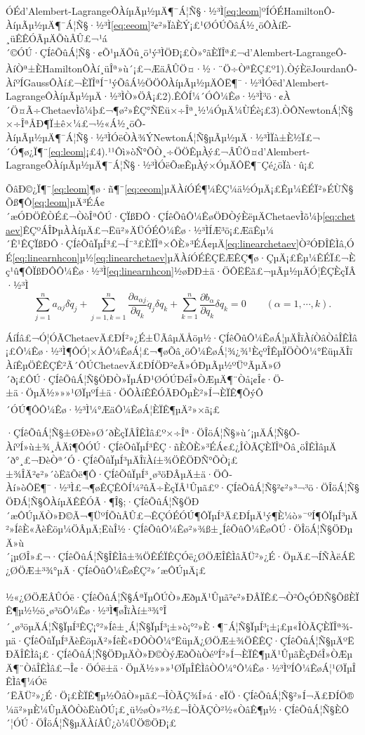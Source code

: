 \documentclass[A4,twoside]{ctexart}
\newcommand{\supercite}[1]{\textsuperscript{\cite{#1}}}
\begin{document}
ÓÉd'Alembert-LagrangeÔ­ÀíµÃµ½µÄ¶¯Á¦Ñ§·½³Ì\eqref{eq:leom}ºÍÓÉHamiltonÔ­ÀíµÃµ½µÄ¶¯Á¦Ñ§·½³Ì\eqref{eq:eeom}²¢²»ÏàÈÝ¡£¹ØÓÚÕâÁ½¸öÔ­ÀíË­¸üÊÊÓÃµÄÕùÂÛ£¬¹á´©ÓÚ·ÇÍêÕûÁ¦Ñ§·¢Õ¹µÄÕû¸ö¹ý³ÌÖÐ¡£Ò»°ãÈÏÎª£¬d'Alembert-LagrangeÔ­ÀíÒª±ÈHamiltonÔ­Àí¸üÎª»ù´¡\supercite{3,4}£¬ÆäÂÛÖ¤·½·¨Ö÷ÒªÊÇ£º1).ÒýÈëJourdanÔ­ÀíºÍGaussÔ­Àí£¬ÈÏÎªÍ¨¹ýÕâÁ½ÖÖÔ­ÀíµÃµ½µÄÔË¶¯·½³ÌÓëd'Alembert-LagrangeÔ­ÀíµÃµ½µÄ·½³ÌÒ»ÖÂ¡£2).ÊÔÍ¼´ÓÔ¼Êø·½³Ì³ö·¢À´Ö¤Ã÷ChetaevÌõ¼þ£¬¶ø²»ÊÇ°ÑËü×÷Îª¸½¼ÓµÄ¼ÙÉè¡£3).ÒÔNewtonÁ¦Ñ§×÷ÎªÅÐ¶Ï±ê×¼£¬½«Á½¸öÔ­ÀíµÃµ½µÄ¶¯Á¦Ñ§·½³ÌÓëÒÀ¾ÝNewtonÁ¦Ñ§µÃµ½µÄ·½³ÌÏà±È½Ï£¬´Ó¶ø¿Ï¶¨\eqref{eq:leom}¡£4).¹¹Ôì»òÑ°ÕÒ¸÷ÖÖÊµÀý£¬ÂÛÖ¤d'Alembert-LagrangeÔ­ÀíµÃµ½µÄ¶¯Á¦Ñ§·½³ÌÓëÕæÊµÀý×ÓµÄÔË¶¯Çé¿öÏà·û¡£


ÕâÐ©¿Ï¶¨\eqref{eq:leom}¶ø·ñ¶¨\eqref{eq:eeom}µÄÀíÓÉ¶¼ÊÇ¼ä½ÓµÄ¡£Êµ¼ÊÉÏ²»ÉÙÑ§Õß¶Ô\eqref{eq:leom}µÄ³ÉÁ¢´æÓÐÖÊÒÉ£¬ÒòÎªÔÚ·ÇÏßÐÔ·ÇÍêÕûÔ¼ÊøÖÐÒýÈëµÄChetaevÌõ¼þ\eqref{eq:chetaev}ÊÇºÁÎÞµÀÀíµÄ£¬Ëü²»ÄÜÓÉÔ¼Êø·½³ÌÍÆ³ö¡£ÆäÊµ¼´Ê¹ÊÇÏßÐÔ·ÇÍêÕûÏµÍ³£¬Í¨³£ÈÏÎª×ÔÈ»³ÉÁ¢µÄ\eqref{eq:linearchetaev}Ò²ÓÐÎÊÌâ,ÓÉ\eqref{eq:linearnhcon}µ½\eqref{eq:linearchetaev}µÄÀíÓÉÊÇËÆÊÇ¶ø·ÇµÄ¡£Êµ¼ÊÉÏ£¬Èç¹û¶ÔÏßÐÔÔ¼Êø·½³Ì\eqref{eq:linearnhcon}½øÐÐ±ä·ÖÔËËã£¬µÃµ½µÄÓ¦ÊÇÈçÏÂ·½³Ì
\begin{equation}
 \sum_{j = 1}^n a_{\alpha j}  \delta \dot{ q}_j +  \sum_{j = 1,k=1}^n \frac{\partial a_{\alpha j} }{\partial q_k} \dot{ q}_j \delta q_k +\sum_{k=1}^n \frac{\partial b_\alpha }{\partial q_k}\delta q_k = 0 \hspace{2em} ( \alpha = 1, \cdots, k).
\end{equation}

ÁíÍâ£¬Ó¦ÓÃChetaevÄ£ÐÍ²»¿É±ÜÃâµÄÅöµ½·ÇÍêÕûÔ¼ÊøÁ¦µÄÎïÀíÒâÒåÎÊÌâ¡£Ô¼Êø·½³Ì¶ÔÓ¦×ÅÔ¼ÊøÁ¦£¬¶øÕâ¸öÔ¼ÊøÁ¦¾¿¾¹ÈçºÎÊµÏÖÒÔ¼°ËüµÄÎïÀíÊµÖÊÊÇÊ²Ã´ÔÚChetaevÄ£ÐÍÖÐ²¢Ã»ÓÐµÃµ½ºÜºÃµÄ»Ø´ð¡£ÔÚ·ÇÍêÕûÁ¦Ñ§ÖÐÒ»ÏµÁÐ¹ØÓÚÐéÎ»ÒÆµÄ¶¨Òå¡¢Î¢·Ö-±ä·ÖµÄ½»»»¹ØÏµºÍ±ä·ÖÔ­ÀíÊÊÓÃÐÔµÈ²»Í¬ÈÏÊ¶ÕýÔ´ÓÚ¶ÔÔ¼Êø·½³Ì¼°ÆäÔ¼ÊøÁ¦ÈÏÊ¶µÄ²»×ã\supercite{8}¡£

·ÇÍêÕûÁ¦Ñ§±ØÐè»Ø´ðÈçÏÂÎÊÌâ£º×÷Îª·ÖÎöÁ¦Ñ§»ù´¡µÄÁ¦Ñ§Ô­ÀíºÍ»ù±¾¸ÅÄî¶ÔÓÚ·ÇÍêÕûÏµÍ³ÊÇ·ñÈÔÈ»³ÉÁ¢£¿ÎÒÃÇÈÏÎªÕâ¸öÎÊÌâµÄ´ð°¸£¬ÐèÒª´Ó·ÇÍêÕûÏµÍ³µÄÎïÀí±¾ÖÊÖÐÑ°ÕÒ¡£±¾ÎÄ²¢²»´òËãÕë¶Ô·ÇÍêÕûÏµÍ³¸ø³öÐÂµÄ±ä·ÖÔ­Àí»òÔË¶¯·½³Ì£¬¶øÊÇÊÔÍ¼²ûÃ÷ÈçÏÂ¹Ûµã£º·ÇÍêÕûÁ¦Ñ§²¢²»³¬³ö·ÖÎöÁ¦Ñ§ÖÐÁ¦Ñ§Ô­ÀíµÄÊÊÓÃ·¶Î§;·ÇÍêÕûÁ¦Ñ§ÖÐ´æÔÚµÄÒ»Ð©Ã¬¶ÜºÍÕùÂÛ£¬ÊÇÓÉÓÚ¶ÔÏµÍ³Ä£ÐÍµÄ¹ý¶È¼ò»¯ºÍ¶ÔÏµÍ³µÄ²»ÍêÈ«ÃèÊöµ¼ÖÂµÄ;ËùÎ½·ÇÍêÕûÔ¼Êø²»¾ß±¸ÍêÕûÔ¼ÊøÔÚ·ÖÎöÁ¦Ñ§ÖÐµÄ»ù´¡µØÎ»£¬·ÇÍêÕûÁ¦Ñ§ÎÊÌâ±¾ÖÊÉÏÊÇÓë¿ØÖÆÎÊÌâÃÜ²»¿É·ÖµÄ£¬ÍÑÀëÁË¿ØÖÆ±³¾°µÄ·ÇÍêÕûÔ¼ÊøÊÇ²»´æÔÚµÄ¡£

½«¿ØÖÆÂÛÓë·ÇÍêÕûÁ¦Ñ§ÁªÏµÔÚÒ»ÆðµÄ¹Ûµã²¢²»ÐÂÏÊ\supercite{7}£¬Ò²ÔçÓÐÑ§ÕßÈÏÊ¶µ½½ö¸ø³öÔ¼Êø·½³Ì¶øÎïÀí±³¾°Î´¸ø³öµÄÁ¦Ñ§ÏµÍ³ÊÇ¡°²»Íê±¸Á¦Ñ§ÏµÍ³¡±»ò¡°²»È·¶¨Á¦Ñ§ÏµÍ³¡±\supercite{8}¡£µ«ÎÒÃÇÈÏÎª¾­µä·ÇÍêÕûÏµÍ³ÃèÊöµÄ²»ÍêÈ«ÐÔÒÔ¼°ËüµÄ¿ØÖÆ±¾ÖÊÊÇ·ÇÍêÕûÁ¦Ñ§µÄºËÐÄÎÊÌâ¡£·ÇÍêÕûÁ¦Ñ§ÖÐµÄÒ»Ð©ÒýÆðÕùÒéºÍ²»Í¬ÈÏÊ¶µÄ¹ÛµãÈçÐéÎ»ÒÆµÄ¶¨ÒåÎÊÌâ£¬Î¢·ÖÓë±ä·ÖµÄ½»»»¹ØÏµÎÊÌâÒÔ¼°Ô¼Êø·½³ÌºÍÔ¼ÊøÁ¦¹ØÏµÎÊÌâ¶¼Óë´ËÃÜ²»¿É·Ö¡£ÈÏÊ¶µ½ÕâÒ»µã£¬ÎÒÃÇ¾Í»á·¢ÏÖ·ÇÍêÕûÁ¦Ñ§²»Í¬Ä£ÐÍÖ®¼ä²»µÈ¼ÛµÄÔ­ÒòËùÔÚ¡£¸ü½øÒ»²½£¬ÎÒÃÇÒ²½«ÒâÊ¶µ½·ÇÍêÕûÁ¦Ñ§ÈÔ´¦ÓÚ·ÖÎöÁ¦Ñ§µÄÀíÂÛ¿ò¼ÜÖ®ÖÐ¡£
\end{document}
